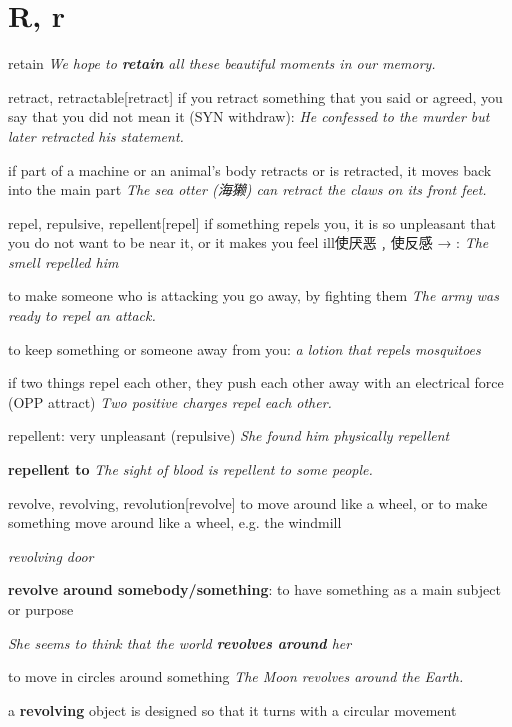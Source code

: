 \section{R, r}

\begin{word}{retain}
    \textit{We hope to \textbf{retain} all these beautiful moments in our memory.}
\end{word}

\begin{word}{retract, retractable}[retract]
    if you retract something that you said or agreed, you say that you did not mean it (SYN  withdraw):
    \textit{He confessed to the murder but later retracted his statement.}

    if part of a machine or an animal's body retracts or is retracted, it moves back into the main part
    \textit{The sea otter (海獭) can retract the claws on its front feet.}
\end{word}

\begin{word}{repel, repulsive, repellent}[repel]
    if something repels you, it is so unpleasant that you do not want to be near it, or it makes you feel ill使厌恶﹐使反感 → :
    \textit{The smell repelled him}

    to make someone who is attacking you go away, by fighting them
    \textit{The army was ready to repel an attack.}

    to keep something or someone away from you:
    \textit{a lotion that repels mosquitoes}

    if two things repel each other, they push each other away with an electrical force (OPP attract)
    \textit{Two positive charges repel each other.}

    repellent: very unpleasant (repulsive)
    \textit{She found him physically repellent}

    \textbf{repellent to}
    \textit{The sight of blood is repellent to some people.}

\end{word}

\begin{word}{revolve, revolving, revolution}[revolve]
    to move around like a wheel, or to make something move around like a wheel, e.g. the windmill

    \textit{revolving door}

    \textbf{revolve around somebody/something}:
    to have something as a main subject or purpose
    
    \textit{She seems to think that the world \textbf{revolves around} her}

    to move in circles around something
    \textit{The Moon revolves around the Earth.}

    a \textbf{revolving} object is designed so that it turns with a circular movement

\end{word}

